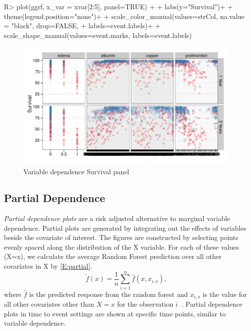 \documentclass[nojss]{jss}\usepackage[]{graphicx}\usepackage[]{color}
\makeatletter
\def\maxwidth{ %
  \ifdim\Gin@nat@width>\linewidth
    \linewidth
  \else
    \Gin@nat@width
  \fi
}
\makeatother
\begin{document}
\begin{Schunk}
\begin{Sinput}
R> plot(ggrf, x_var = xvar[2:5], panel=TRUE) +
+   labs(y="Survival")+
+   theme(legend.position="none")+
+   scale_color_manual(values=strCol, na.value = "black", drop=FALSE,
+                      labels=event.labels)+
+   scale_shape_manual(values=event.marks, labels=event.labels)
\end{Sinput}
\begin{figure}[!htpb]

{\centering \includegraphics[width=\maxwidth]{figure/rfs-variable-plotCombines-1} 

}

\caption[Variable dependence Survival panel]{Variable dependence Survival panel\label{fig:variable-plotCombines}}
\end{figure}
\end{Schunk}

\subsection{Partial Dependence}\label{S:partialDependence}

\emph{Partial dependence plots} are a risk adjusted alternative to marginal variable dependence. Partial plots are generated by integrating out the effects of variables beside the covariate of interest. The figures are constructed by selecting points evenly spaced along the distribution of the X variable. For each of these values (X=x), we calculate the average Random Forest prediction over all other covariates in X by \eqref{E:partial}.
\begin{equation}
\tilde{f}(x) = \frac{1}{n} \sum_{i=1}^n \hat{f}(x, x_{i,o}),
\label{E:partial}
\end{equation}
where $\hat{f}$ is the predicted response from the random forest and $x_{i,o}$ is the value for all other covariates other than $X=x$ for the observation $i$~\citep{FriedmanGreedyfunction:2000}. Partial dependence plots in time to event settings are shown at specific time points, similar to variable dependence.
\end{document}
